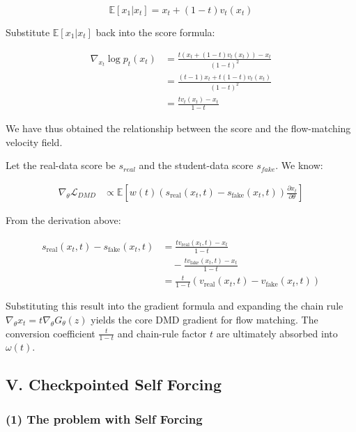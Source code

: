 \[
\mathbb{E}[x_1|x_t]=x_t+(1-t)v_t(x_t)
\]

Substitute \(\mathbb{E}[x_1|x_t]\) back into the score formula:

\[
\begin{aligned}
\nabla_{x_t}\log p_t(x_t)
&=
\frac{t(x_t+(1-t)v_t(x_t))-x_t}{(1-t)^2}
\\
&=
\frac{(t-1)x_t+t(1-t)v_t(x_t)}{(1-t)^2}
\\
&=
\frac{t v_t(x_t)-x_t}{1-t}
\end{aligned}
\]

We have thus obtained the relationship between the score and the flow-matching velocity field.

Let the real-data score be \(s_{real}\) and the student-data score \(s_{fake}\). We know:

\[
\begin{aligned}
\nabla_\theta\mathcal{L}_{DMD}
&\propto
\mathbb{E}\left[
w(t)
\left(s_{\mathrm{real}}(x_t,t)-s_{\mathrm{fake}}(x_t,t)\right)
\frac{\partial x_t}{\partial\theta}
\right]
\end{aligned}
\]

From the derivation above:

\[
\begin{aligned}
s_{\mathrm{real}}(x_t,t)-s_{\mathrm{fake}}(x_t,t)
&=
\frac{t v_{\mathrm{real}}(x_t,t)-x_t}{1-t}
\\
&\quad-
\frac{t v_{\mathrm{fake}}(x_t,t)-x_t}{1-t}
\\
&=
\frac{t}{1-t}\left(v_{\mathrm{real}}(x_t,t)-v_{\mathrm{fake}}(x_t,t)\right)
\end{aligned}
\]

Substituting this result into the gradient formula and expanding the chain rule \(\nabla_\theta x_t=t\nabla_\theta G_\theta(z)\) yields the core DMD gradient for flow matching. The conversion coefficient \(\frac{t}{1-t}\) and chain-rule factor \(t\) are ultimately absorbed into \(\omega(t)\).

\hypertarget{v.-checkpointed-self-forcing}{%
\subsection{V. Checkpointed Self Forcing}\label{v.-checkpointed-self-forcing}}

\hypertarget{the-problem-with-self-forcing}{%
\subsubsection{(1) The problem with Self Forcing}\label{the-problem-with-self-forcing}}

